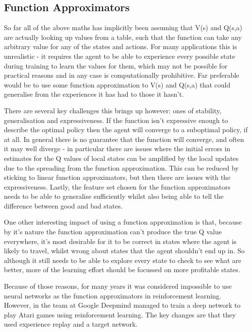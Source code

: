 \subsection{Function Approximators}
So far all of the above maths has implicitly been assuming that V(s) and Q(s,a) are actually looking up values from a table, such that the function can take any arbitrary value for any of the states and actions. For many applications this is unrealistic - it requires the agent to be able to experience every possible state during training to learn the values for them, which may not be possible for practical reasons and in any case is computationally prohibitive. Far preferable would be to use some function approximation to V(s) and Q(s,a) that could generalise from the experiences it has had to those it hasn't.

There are several key challenges this brings up however: ones of stability, generalisation and expressiveness. If the function isn't expressive enough to describe the optimal policy then the agent will converge to a suboptimal policy, if at all. In general there is no guarantee that the function will converge, and often it may well diverge - in particular there are issues where the initial errors in estimates for the Q values of local states can be amplified by the local updates due to the spreading from the function approximation. This can be reduced by sticking to linear function approximators, but then there are issues with the expressiveness. Lastly, the feature set chosen for the function approximators needs to be able to generalise sufficiently whilst also being able to tell the difference between good and bad states.

One other interesting impact of using a function approximation is that, because by it's nature the function approximation can't produce the true Q value everywhere, it's most desirable for it to be correct in states where the agent is likely to travel, whilst wrong about states that the agent shouldn't end up in. So although it still needs to be able to explore every state to check to see what are better, more of the learning effort should be focussed on more profitable states.

Because of those reasons, for many years it was considered impossible to use neural networks as the function approximators in reinforcement learning. However, in \cite{dpmind atari} the team at Google Deepmind managed to train a deep network to play Atari games using reinforcement learning. The key changes are that they used experience replay and a target network. 

